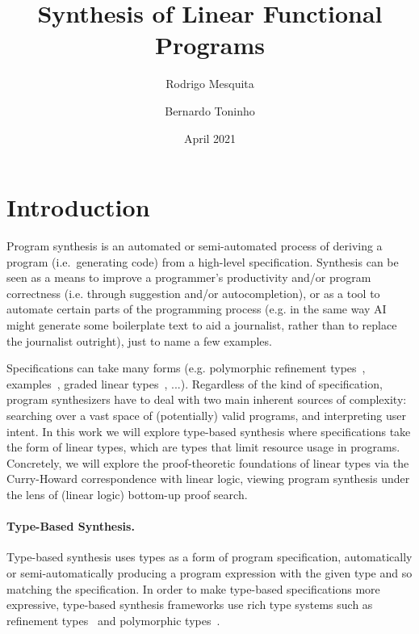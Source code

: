 \documentclass{llncs}
\title{Synthesis of Linear Functional Programs}
\author{Rodrigo Mesquita \and Bernardo Toninho}
\date{April 2021}
\institute{NOVA School of Science and Technology}
\newcommand{\mypara}[1]{\paragraph{\textbf{#1}.}}
\begin{document}
\maketitle

\section{Introduction}

Program synthesis is an automated or semi-automated process of
deriving a program (i.e.~generating code) from a high-level
specification.  
%
Synthesis can be seen as a means to improve a programmer's
productivity and/or program correctness (i.e. through suggestion
and/or autocompletion), or as a tool to automate certain parts of the
programming process (e.g. in the same way AI might generate some
boilerplate text to aid a journalist, rather than to replace the
journalist outright), just to name a few examples.

Specifications can take many forms (e.g.  polymorphic refinement
types~\cite{DBLP:conf/pldi/PolikarpovaKS16},
examples~\cite{DBLP:conf/popl/FrankleOWZ16}, graded linear
types~\cite{DBLP:conf/lopstr/HughesO20}, ...).  Regardless of the kind
of specification, program synthesizers have to deal with two main
inherent sources of complexity: searching over a vast space of
(potentially) valid programs, and interpreting user intent.
%
In this work we will explore type-based synthesis where specifications
take the form of linear types, which are types that limit resource
usage in programs.  Concretely, we will explore the proof-theoretic
foundations of linear types via the Curry-Howard correspondence with
linear logic, viewing program synthesis under the lens of (linear
logic) bottom-up proof search.
%

%


\mypara{Type-Based Synthesis}
Type-based synthesis uses types as a form of program specification,
automatically or semi-automatically producing a program expression
with the given type and so matching the specification.
%
In order to make type-based specifications more expressive, type-based
synthesis frameworks use rich type systems such as refinement
types~\cite{} and polymorphic types~\cite{}.
\end{document}
